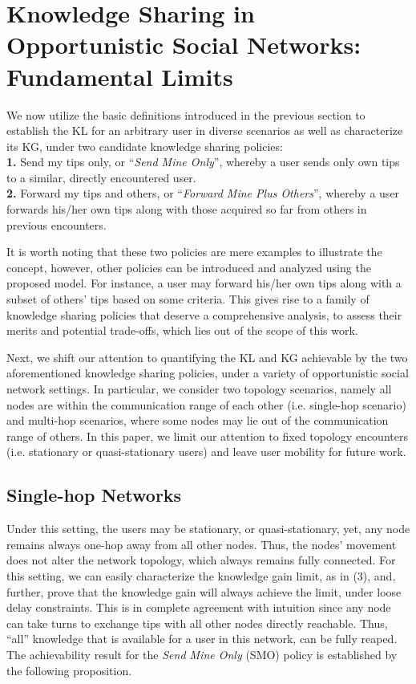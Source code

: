 \documentclass[conference]{IEEEtran}
\theoremstyle{definition}
\begin{document}
\vspace{-0.2 cm}
\section{Knowledge Sharing in Opportunistic Social Networks: Fundamental Limits}

We now utilize the basic definitions introduced in the previous section to establish the KL for an arbitrary user in diverse scenarios as well as characterize its KG, under two candidate knowledge sharing policies:\\
{\bf 1.} Send my tips only, or ``{\it Send Mine Only}'', whereby a user sends only own 
tips to a similar, directly encountered user.\\ 
{\bf 2.} Forward my tips and others, or ``{\it Forward Mine Plus Others}'', whereby a user forwards his/her own tips along with those acquired so far from others in previous encounters.

It is worth noting that these two policies are mere examples to illustrate the concept, however, other policies can be introduced and analyzed using the proposed model.
For instance, a user may forward his/her own tips along with a subset of others' tips based on some criteria. This gives rise to a family of knowledge sharing policies that deserve a comprehensive analysis, to assess their merits and potential trade-offs, which lies out of the scope of this work. 


Next, we shift our attention to quantifying the KL and KG achievable by the two aforementioned knowledge sharing policies, under a variety of opportunistic social network settings. In particular, we consider two topology scenarios, namely all nodes are within the communication range of each other (i.e. single-hop scenario) and multi-hop scenarios, where some nodes may lie out of the communication range of others. In this paper, we limit our attention to fixed topology encounters (i.e. stationary or quasi-stationary users) and leave user mobility for future work.


\vspace{-0.2 cm}
\subsection{Single-hop Networks}
Under this setting, the users may be stationary, or quasi-stationary, yet, any
node remains always one-hop away from all other nodes. Thus, the nodes' movement does not alter the network topology, which always remains fully connected. 
For this setting, we can easily characterize the knowledge gain limit, as in (3), and, further, prove that the knowledge gain will always achieve the limit, under loose delay constraints. This is in complete agreement with intuition since any node can take turns to exchange tips with all other nodes directly reachable. Thus, ``all'' knowledge that is available for a user in this network, can be fully reaped. 
The achievability result for the {\it Send Mine Only} (SMO) policy is established by the following proposition.
\end{document}

